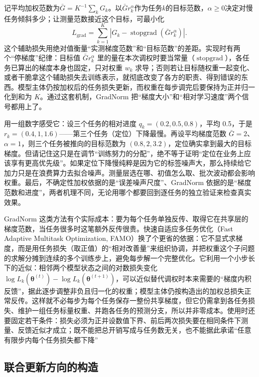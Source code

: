 记平均加权范数为$\bar G=K^{-1}\sum_kG_k$。以$\bar G r_k^\alpha$作为任务$k$的目标范数，$\alpha\geq0$决定对慢任务倾斜多少；让测量范数接近这个目标，可最小化
\begin{equation}
  L_{\mathrm{grad}}
  =\sum_{k=1}^{K}
  \left|G_k-
    \operatorname{stopgrad}(\bar G r_k^\alpha)\right|.
  \label{eq:ket-sharing-gradnorm-objective}
\end{equation}
这个辅助损失用绝对值衡量“实测梯度范数”和“目标范数”的差距。实现时有两个“停梯度”纪律：目标值 $\bar G r_k^\alpha$ 里的量在本次调权时要当常量（$\operatorname{stopgrad}$），各任务已算出的梯度本身也固定，只对权重 $w_k$ 求导；否则若让目标随权重一起变化、或者干脆拿这个辅助损失去训练表示，就彻底改变了各方的职责、得到错误的东西。模型主体仍按加权后的任务损失更新，而权重在每步调完后要保持为正并归一化到和为 $K$。通过这套机制，GradNorm 把“梯度大小”和“相对学习速度”两个信号都用上了。

用一组数字感受它：设三个任务的相对进度 $q_k=(0.2,0.5,0.8)$，平均 0.5，于是 $r_k=(0.4,1,1.6)$——第三个任务（定位）下降最慢。再设平均梯度范数 $\bar G=2$、$\alpha=1$，则三个任务被推向的目标范数为 $(0.8,2,3.2)$，定位确实拿到最大的目标梯度。但请记住这只是在调节“训练努力的分配”，绝不等于证明“定位在业务上应该享有更高优先级”。如果定位下降慢纯粹是因为它的标签噪声大，那么持续给它加力只是在浪费算力去拟合噪声。测量层选在哪、初值怎么取、批次波动都会影响权重。最后，不确定性加权依据的是“误差噪声尺度”、GradNorm 依据的是“梯度范数和进度”，两者机理不同，无论用哪个都要回到逐任务的独立验证来检查真实效果。

GradNorm 这类方法有个实际成本：要为每个任务单独反传、取得它在共享层的梯度范数，当任务很多时这笔额外反传很贵。快速自适应多任务优化（Fast Adaptive Multitask Optimization, FAMO）换了个更省的依据：它不显式求梯度，而是用任务损失（取正值）的“相对改善量”来组织协调，并把权重这个子问题的求解分摊到连续的多个训练步上，避免每步解一个完整优化。它利用一个小步长下的近似：相邻两个模型状态之间的对数损失变化 $\log L_k(\bm\theta^{(t)})-\log L_k(\bm\theta^{(t+1)})$，可以近似替代调权时本来需要的“梯度内积反馈”，据此逐步调整非负且归一化的权重；模型主体仍按构造出的加权总损失正常反传。这样就不必每步为每个任务保存一整份共享梯度，但它仍需拿到各任务损失、维护一组任务标量权重、并跑各任务的预测分支，所以并非零成本。使用时还要固定若干条件：损失必须为正并设数值下界、前后两次损失要在相同条件下测量、反馈近似才成立；既不能把总开销写成与任务数无关，也不能据此承诺“任意有限步内每个任务损失都下降”

\subsection{联合更新方向的构造}
\label{sec:ket-sharing-directions}

